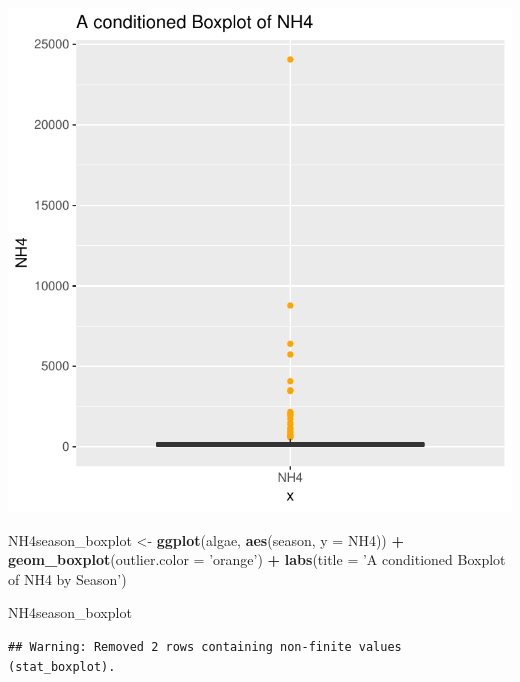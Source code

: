 \documentclass[]{article}
\newenvironment{Shaded}{\begin{snugshade}}{\end{snugshade}}
\newcommand{\KeywordTok}[1]{\textcolor[rgb]{0.13,0.29,0.53}{\textbf{#1}}}
\newcommand{\DataTypeTok}[1]{\textcolor[rgb]{0.13,0.29,0.53}{#1}}
\newcommand{\StringTok}[1]{\textcolor[rgb]{0.31,0.60,0.02}{#1}}
\newcommand{\OperatorTok}[1]{\textcolor[rgb]{0.81,0.36,0.00}{\textbf{#1}}}
\newcommand{\NormalTok}[1]{#1}
\begin{document}
\begin{center}\includegraphics{homework1-handout_files/figure-latex/unnamed-chunk-3-1} \end{center}

\begin{Shaded}
\begin{Highlighting}[]
\NormalTok{NH4season_boxplot <-}\StringTok{ }\KeywordTok{ggplot}\NormalTok{(algae, }\KeywordTok{aes}\NormalTok{(season, }\DataTypeTok{y =}\NormalTok{ NH4)) }\OperatorTok{+}
\StringTok{  }\KeywordTok{geom_boxplot}\NormalTok{(}\DataTypeTok{outlier.color =} \StringTok{'orange'}\NormalTok{) }\OperatorTok{+}
\StringTok{  }\KeywordTok{labs}\NormalTok{(}\DataTypeTok{title =} \StringTok{'A conditioned Boxplot of NH4 by Season'}\NormalTok{)}

\NormalTok{NH4season_boxplot}
\end{Highlighting}
\end{Shaded}

\begin{verbatim}
## Warning: Removed 2 rows containing non-finite values (stat_boxplot).
\end{verbatim}
\end{document}
